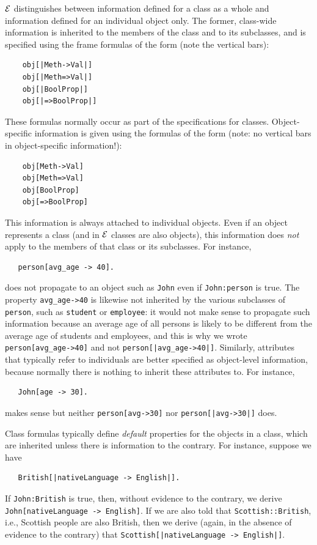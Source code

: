 \documentclass[11pt]{article}
\newcommand{\ERGO}{\mbox{\ensuremath{\cal{E}}\smaller{{\sc{RGO}}}}\xspace}
\newcommand{\FLSYSTEM}{\ERGO}
\begin{document}
\FLSYSTEM distinguishes between information defined for a class as a whole
and information defined for an individual object only.
The former, class-wide information is inherited to the members of the class and to its
subclasses, and is specified using the frame formulas of the form
(note the vertical bars):
\begin{verbatim}
    obj[|Meth->Val|]
    obj[|Meth=>Val|]
    obj[|BoolProp|]
    obj[|=>BoolProp|]
\end{verbatim}
These formulas normally occur as part of the specifications for classes.
Object-specific information is given using the formulas of
the form (note: no vertical bars in object-specific information!):
\begin{verbatim}
    obj[Meth->Val]
    obj[Meth=>Val]
    obj[BoolProp]
    obj[=>BoolProp]
\end{verbatim}
This information is always attached to individual
objects. Even if an object represents a class (and in \FLSYSTEM classes are
also objects), this information
does \emph{not} apply to the members of that class or its subclasses. For
instance,
\begin{verbatim}
   person[avg_age -> 40].  
\end{verbatim}
does not propagate to an object such as \texttt{John} even if
\texttt{John:person}  is true. The property \texttt{avg\_age->40} 
is likewise not inherited by the various subclasses of
\texttt{person}, such as \texttt{student} or \texttt{employee}: it would
not make sense to propagate such information because an average age of all
persons is likely to be different from the average age of students and
employees, and this is why we wrote \texttt{person[avg\_age->40]}   
and not \texttt{person[|avg\_age->40|]}.
Similarly, attributes that typically refer to individuals are better
specified as object-level information, because normally there is nothing to
inherit these attributes to. For instance,
\begin{verbatim}
   John[age -> 30].  
\end{verbatim}
makes sense but neither \texttt{person[avg->30]} nor
\texttt{person[|avg->30|]} does.

Class formulas typically define \emph{default} properties 
for the objects in a class, which are inherited unless there is information
to the contrary. For instance, suppose we have
\begin{verbatim}
   British[|nativeLanguage -> English|].  
\end{verbatim}
If {\tt John:British} is true, then, without evidence to the contrary,
we derive {\tt
  John[nativeLanguage -> English]}.
If we are also told that {\tt Scottish::British}, i.e., Scottish
  people are also British, then we derive (again, in the absence of 
  evidence to the contrary)
  that {\tt Scottish[|nativeLanguage -> English|]}.
  
\end{document}
